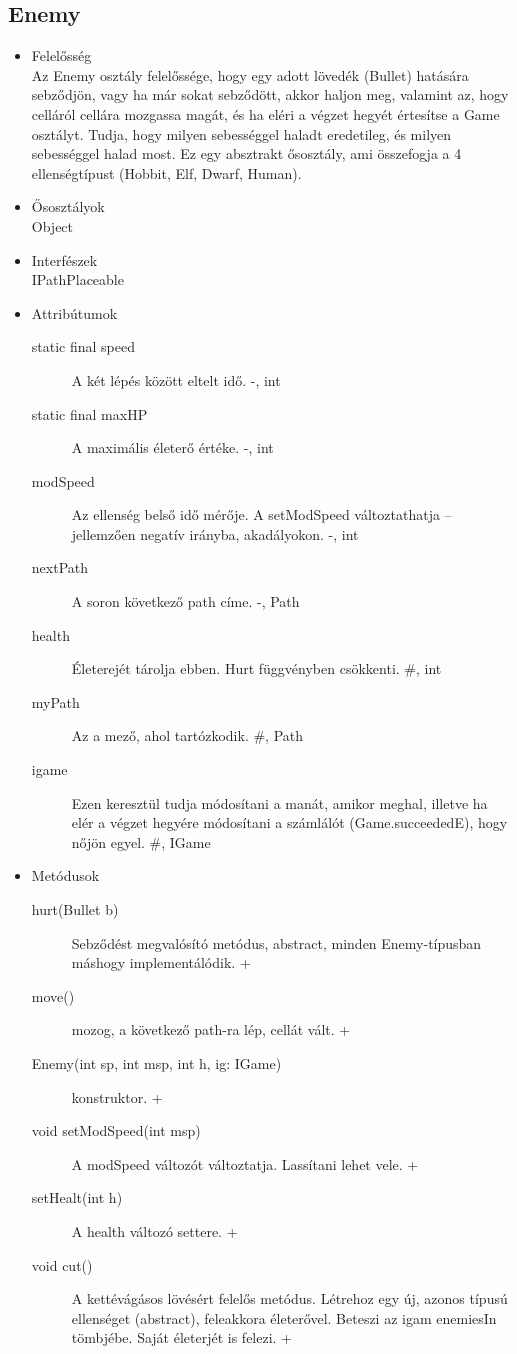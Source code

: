 \subsection{Enemy}
\begin{itemize}
\item Felelősség\\
Az Enemy osztály felelőssége, hogy egy adott lövedék (Bullet) hatására sebződjön, vagy ha már sokat sebződött, akkor haljon meg, valamint az, hogy celláról cellára mozgassa magát, és ha eléri a végzet hegyét értesítse a Game osztályt. Tudja, hogy milyen sebességgel haladt eredetileg, és milyen sebességgel halad most. Ez egy absztrakt ősosztály, ami összefogja a 4 ellenségtípust (Hobbit, Elf, Dwarf, Human).
\item Ősosztályok\\
Object
\item Interfészek\\
IPathPlaceable
\item Attribútumok\\
	\begin{description}
		\item[static final speed] A két lépés között eltelt idő. -, int
		\item[static final maxHP] A maximális életerő értéke. -, int
\item[modSpeed] Az ellenség belső idő mérője. A setModSpeed változtathatja – jellemzően negatív irányba, akadályokon. -, int
\item[nextPath] A soron következő path címe. -, Path
\item[health] Életerejét tárolja ebben. Hurt függvényben csökkenti. #, int
\item[myPath] Az a mező, ahol tartózkodik. #, Path
\item[igame] Ezen keresztül tudja módosítani a manát, amikor meghal, illetve ha elér a végzet hegyére módosítani a számlálót (Game.succeededE), hogy nőjön egyel. #, IGame

	\end{description}
\item Metódusok\\
	\begin{description}
		\item[hurt(Bullet b)] Sebződést megvalósító metódus, abstract, minden Enemy-típusban máshogy implementálódik. +
\item[move()] mozog, a következő path-ra lép, cellát vált. +
\item[Enemy(int sp, int msp, int h, ig: IGame)] konstruktor. +
\item[void setModSpeed(int msp)] A modSpeed változót változtatja. Lassítani lehet vele. +
\item[setHealt(int h)] A health változó settere. +
\item[void cut()] A kettévágásos lövésért felelős metódus. Létrehoz egy új, azonos típusú ellenséget (abstract), feleakkora életerővel. Beteszi az igam enemiesIn tömbjébe. Saját életerjét is felezi. +

	\end{description}
\end{itemize}

